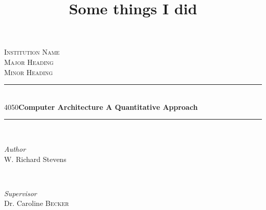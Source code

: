 \documentclass[12pt]{ctexbook}
\title{Some things I did}
\makeatletter
\newcommand\HUGE{\@setfontsize\Huge{40}{50}}
\makeatother
\begin{document}
\begin{titlepage} %
	\newcommand{\HRule}{\rule{\linewidth}{0.5mm}} %

	\center %


	\textsc{\LARGE Institution Name}\\[1.5cm] %

	\textsc{\Large Major Heading}\\[0.5cm] %

	\textsc{\large Minor Heading}\\[0.5cm] %


	\HRule\\[0.4cm]

	{\HUGE\bfseries Computer Architecture A Quantitative Approach}\\[0.5cm] %

	\HRule\\[1.5cm]


	\begin{minipage}{0.4\textwidth}
		\begin{flushleft}
			\large
			\textit{Author}\\
      W. Richard Stevens
		\end{flushleft}
	\end{minipage}
	~
	\begin{minipage}{0.4\textwidth}
		\begin{flushright}
			\large
			\textit{Supervisor}\\
			Dr. Caroline \textsc{Becker} %
		\end{flushright}
	\end{minipage}


\end{titlepage}
\end{document}
